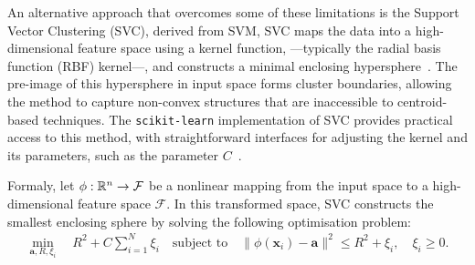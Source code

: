 



An alternative approach that overcomes some of these limitations is the Support
Vector Clustering (\gls{SVC}), derived from \gls{SVM}, \gls{SVC} maps the data
into a high-dimensional feature space using a kernel function, ---typically the
radial basis function (RBF) kernel---, and
constructs a minimal enclosing hypersphere~\cite{BenHur2001}. The pre-image of
this hypersphere in input space forms cluster boundaries, allowing the method
to capture non-convex structures that are inaccessible to centroid-based
techniques. The \texttt{scikit-learn} implementation of \gls{SVC} provides practical
access to this method, with straightforward interfaces for adjusting the kernel
and its parameters, such as the parameter $C$~\cite{scikit-learn}.

Formaly, let $\phi: \rreal[n] \rightarrow \mathcal{F}$ be a nonlinear mapping from the
input space to a high-dimensional feature space $\mathcal{F}$. In this
transformed space, \gls{SVC} constructs the smallest enclosing sphere by
solving the following optimisation problem:
%
\begin{align}
  \min_{\mathbf{a}, R, \xi_i} \quad R^2 + C \sum_{i=1}^N \xi_i \quad \text{subject to} \quad
  \|\phi(\mathbf{x}_i) - \mathbf{a}\|^2 \leq R^2 + \xi_i,\quad \xi_i \geq 0.
\end{align}

